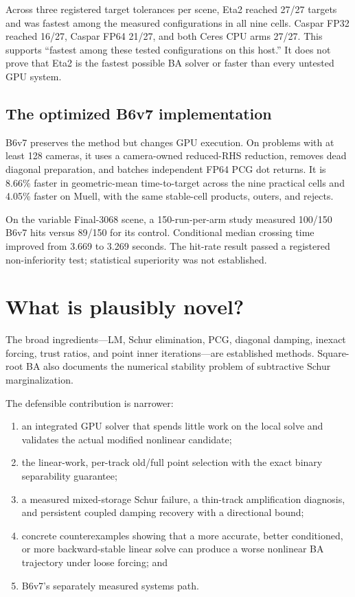 \documentclass[11pt]{article}
\begin{document}
Across three registered target tolerances per scene, Eta2 reached 27/27 targets and was fastest among the measured configurations in all nine cells.  Caspar FP32 reached 16/27, Caspar FP64 21/27, and both Ceres CPU arms 27/27.  This supports ``fastest among these tested configurations on this host.''  It does not prove that Eta2 is the fastest possible BA solver or faster than every untested GPU system.

\subsection{The optimized B6v7 implementation}

B6v7 preserves the method but changes GPU execution.  On problems with at least 128 cameras, it uses a camera-owned reduced-RHS reduction, removes dead diagonal preparation, and batches independent FP64 PCG dot returns.  It is 8.66\% faster in geometric-mean time-to-target across the nine practical cells and 4.05\% faster on Muell, with the same stable-cell products, outers, and rejects.

On the variable Final-3068 scene, a 150-run-per-arm study measured 100/150 B6v7 hits versus 89/150 for its control.  Conditional median crossing time improved from 3.669 to 3.269 seconds.  The hit-rate result passed a registered non-inferiority test; statistical superiority was not established.

\section{What is plausibly novel?}

The broad ingredients---LM, Schur elimination, PCG, diagonal damping, inexact forcing, trust ratios, and point inner iterations---are established methods\cite{Agarwal2010,Triggs2000,EisenstatWalker1996,Conn2000,Jeong2012}.  Square-root BA also documents the numerical stability problem of subtractive Schur marginalization\cite{Demmel2021}.

The defensible contribution is narrower:

\begin{enumerate}
  \item an integrated GPU solver that spends little work on the local solve and validates the actual modified nonlinear candidate;
  \item the linear-work, per-track old/full point selection with the exact binary separability guarantee;
  \item a measured mixed-storage Schur failure, a thin-track amplification diagnosis, and persistent coupled damping recovery with a directional bound;
  \item concrete counterexamples showing that a more accurate, better conditioned, or more backward-stable linear solve can produce a worse nonlinear BA trajectory under loose forcing; and
  \item B6v7's separately measured systems path.
\end{enumerate}
\end{document}

